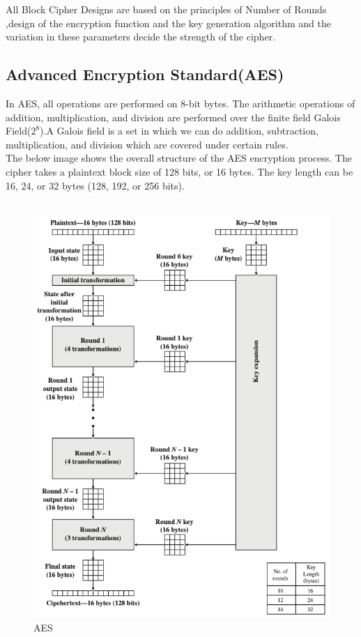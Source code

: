 \documentclass{article}
\begin{document}
All Block Cipher Designs are based on the principles of Number of Rounds ,design of the encryption function and the key generation algorithm and the variation in these parameters decide the strength of the cipher.

\subsection{Advanced Encryption Standard(AES)}
In AES, all operations are performed on 8-bit bytes. The arithmetic operations of addition, multiplication, and division are performed over the finite field Galois Field($2^8$).A Galois field is a set in which we can do addition, subtraction, multiplication, and division which are covered under certain rules.\\
The below image shows the overall structure of the AES encryption process. The cipher takes a plaintext block size of 128 bits, or 16 bytes. The key length can be 16, 24, or 32 bytes (128, 192, or 256 bits).\\
\\
\begin{figure}
\begin{center}
    
    \includegraphics[scale = 0.60]{images/AES.png}
    \caption{AES}

\end{center}
 \end{figure}
\end{document}
